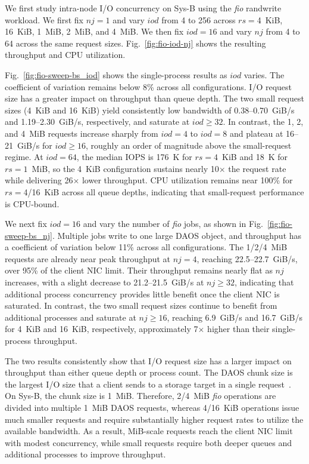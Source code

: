We first study intra-node I/O concurrency on Sys-B using the \textit{fio} randwrite workload. We first fix $nj{=}1$ and vary $iod$ from 4 to 256 across $rs{=}$4~KiB, 16~KiB, 1~MiB, 2~MiB, and 4~MiB. We then fix $iod{=}16$ and vary $nj$ from 4 to 64 across the same request sizes. Fig.~\ref{fig:fio-iod-nj} shows the resulting throughput and CPU utilization.

Fig.~\ref{fig:fio-sweep-bs_iod} shows the single-process results as $iod$ varies. The coefficient of variation remains below 8\% across all configurations. I/O request size has a greater impact on throughput than queue depth. The two small request sizes (4~KiB and 16~KiB) yield consistently low bandwidth of 0.38--0.70~GiB/s and 1.19--2.30~GiB/s, respectively, and saturate at $iod{\geq}32$. In contrast, the 1, 2, and 4~MiB requests increase sharply from $iod{=}4$ to $iod{=}8$ and plateau at 16--21~GiB/s for $iod{\geq}16$, roughly an order of magnitude above the small-request regime. At $iod{=}64$, the median IOPS is 176~K for $rs{=}4$~KiB and 18~K for $rs{=}1$~MiB, so the 4~KiB configuration sustains nearly 10$\times$ the request rate while delivering 26$\times$ lower throughput. CPU utilization remains near 100\% for $rs{=}$4/16~KiB across all queue depths, indicating that small-request performance is CPU-bound.

We next fix $iod{=}16$ and vary the number of \textit{fio} jobs, as shown in Fig.~\ref{fig:fio-sweep-bs_nj}. Multiple jobs write to one large DAOS object, and throughput has a coefficient of variation below 11\% across all configurations. The 1/2/4~MiB requests are already near peak throughput at $nj{=}4$, reaching 22.5--22.7~GiB/s, over 95\% of the client NIC limit. Their throughput remains nearly flat as $nj$ increases, with a slight decrease to 21.2--21.5~GiB/s at $nj{\geq}32$, indicating that additional process concurrency provides little benefit once the client NIC is saturated. In contrast, the two small request sizes continue to benefit from additional processes and saturate at $nj{\geq}16$, reaching 6.9~GiB/s and 16.7~GiB/s for 4~KiB and 16~KiB, respectively, approximately 7$\times$ higher than their single-process throughput.

The two results consistently show that I/O request size has a larger impact on throughput than either queue depth or process count. The DAOS chunk size is the largest I/O size that a client sends to a storage target in a single request~\cite{daos-user-guide}. On Sys-B, the chunk size is 1~MiB. Therefore, 2/4~MiB \textit{fio} operations are divided into multiple 1~MiB DAOS requests, whereas 4/16~KiB operations issue much smaller requests and require substantially higher request rates to utilize the available bandwidth. As a result, MiB-scale requests reach the client NIC limit with modest concurrency, while small requests require both deeper queues and additional processes to improve throughput.

